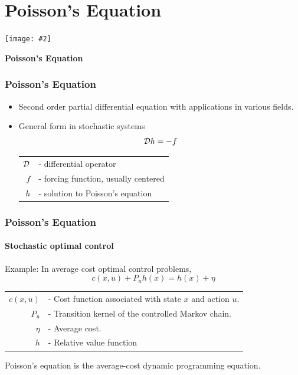 \documentclass[xcolor=dvipsnames, subsection=false]{beamer}
\def\alertb#1{\alert{\color{BrickRed}  #1}}
\def\alertb#1{\alert{\color{BrickRed}  #1}}
\newcounter{temp}
\newenvironment{framesection}%
{\setcounter{temp}{\value{framenumber}}
\begin{frame}
\thispagestyle{empty}
}%
{\end{frame}\setcounter{framenumber}{\value{temp}}}
\def\Ebox#1#2{%
	\begin{center}
		\texttt{[image: \#2]} %
	\end{center}}
\def\generate{{\cal D}}
\begin{document}
\section{Poisson's Equation}

\begin{framesection}
	
	
	\Ebox{.6}{FishBanner.pdf}
	
	\vfill
	
	\centerline{\Large\bf Poisson's Equation}
	
\end{framesection}


\begin{frame}
\frametitle{Poisson's Equation}
\begin{itemize}
	\item Second order partial differential equation with applications in various fields.
	\item General form in stochastic systems
	{\LARGE
	\[
	\generate h =  -f
	\]
    }
	
	
	\begin{tabular}{rl}
$\generate$ & - differential operator\\
$f$ & - forcing function, usually centered\\ \pause
{\LARGE \alertb{$h$}} & {\LARGE \alertb{- solution to Poisson's equation}}
	\end{tabular}
\end{itemize}
\end{frame}



\begin{frame}
\frametitle{Poisson's Equation}
\framesubtitle{Stochastic optimal control}
 \alertb{Example:} In average cost optimal control problems,
\[
c(x,u) + P_u h(x) = h(x) + \eta
\]
\begin{tabular}{rl}
$c(x,u)$ & - Cost function associated with state $x$ and action $u$.\\
$P_u$ & - Transition kernel of the controlled Markov chain. \\	
$\eta$ & - Average cost.\\
{\LARGE \alertb{$h$}} & - {\LARGE \alertb{Relative value function}} \\
\end{tabular}
Poisson's equation is the average-cost dynamic programming equation.
\end{frame}
\end{document}
